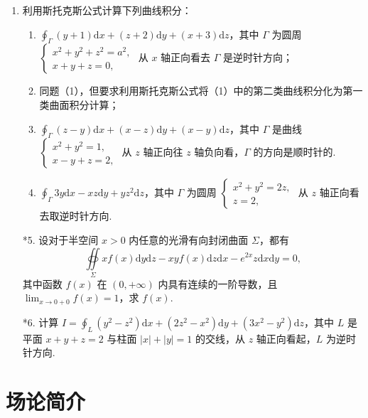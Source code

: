 \begin{enumerate}
    \item 利用斯托克斯公式计算下列曲线积分：
    \begin{enumerate}[(1)]\setlength{\itemsep}{5pt}\setlength{\topsep}{15pt}
        \item $\displaystyle\oint_{\Gamma}(y+1)\text{d}x+(z+2)\text{d}y+(x+3)\text{d}z$，其中 $\Gamma$ 为圆周 $\begin{cases}
            x^2+y^2+z^2=a^2,\\
            x+y+z=0,
        \end{cases}$ 从 $x$ 轴正向看去 $\Gamma$ 是逆时针方向；
        \item 同题（1），但要求利用斯托克斯公式将（1）中的第二类曲线积分化为第一类曲面积分计算；
        \item $\displaystyle\oint_{\Gamma}(z-y)\text{d}x+(x-z)\text{d}y+(x-y)\text{d}z$，其中 $\Gamma$ 是曲线$\begin{cases}
            x^2+y^2=1,\\
            x-y+z=2,
        \end{cases}$ 从 $z$ 轴正向往 $z$ 轴负向看，$\Gamma$ 的方向是顺时针的.
        \item $\displaystyle\oint_{\Gamma}3y\text{d}x-xz\text{d}y+yz^2\text{d}z$，其中 $\Gamma$ 为圆周 $\begin{cases}
            x^2+y^2=2z,\\
            z=2,
        \end{cases}$ 从 $z$ 轴正向看去取逆时针方向.
    \end{enumerate}

    \item[*5.] 设对于半空间 $x>0$ 内任意的光滑有向封闭曲面 $\Sigma$，都有
    \[
        \oiint\limits_{\Sigma}xf(x)\text{d}y\text{d}z-xyf(x)\text{d}z\text{d}x-e^{2x}z\text{d}x\text{d}y=0,
    \]
    其中函数 $f(x)$ 在 $(0, +\infty)$ 内具有连续的一阶导数，且 $\displaystyle\lim_{x\to0+0}f(x)=1$，求 $f(x)$.
    
    \item[*6.] 计算 $I=\displaystyle\oint_{L}(y^2-z^2)\text{d}x+(2z^2-x^2)\text{d}y+(3x^2-y^2)\text{d}z$，其中 $L$ 是平面 $x+y+z=2$ 与柱面 $|x|+|y|=1$ 的交线，从 $z$ 轴正向看起，$L$ 为逆时针方向.
\end{enumerate}

\section{场论简介}

